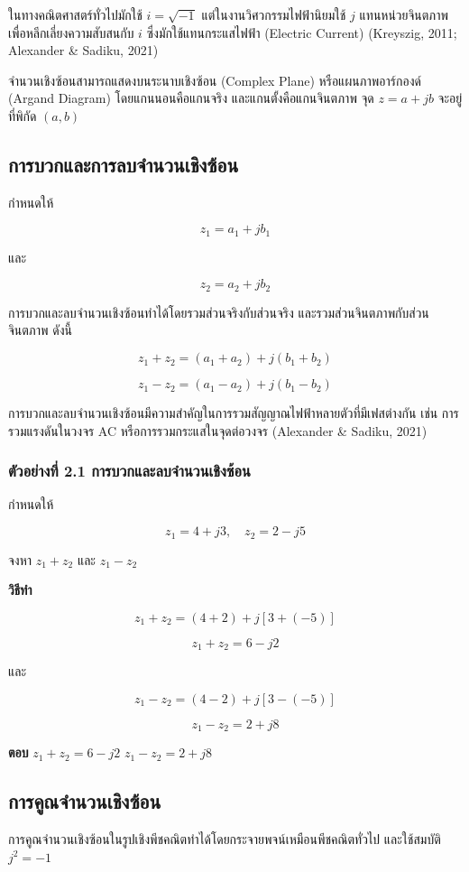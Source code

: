 ในทางคณิตศาสตร์ทั่วไปมักใช้ $i=\sqrt{-1}$ แต่ในงานวิศวกรรมไฟฟ้านิยมใช้ $j$ แทนหน่วยจินตภาพ เพื่อหลีกเลี่ยงความสับสนกับ $i$ ซึ่งมักใช้แทนกระแสไฟฟ้า (Electric Current) (Kreyszig, 2011; Alexander \& Sadiku, 2021)

จำนวนเชิงซ้อนสามารถแสดงบนระนาบเชิงซ้อน (Complex Plane) หรือแผนภาพอาร์กองด์ (Argand Diagram) โดยแกนนอนคือแกนจริง และแกนตั้งคือแกนจินตภาพ จุด $z=a+jb$ จะอยู่ที่พิกัด $(a,b)$

\subsection{การบวกและการลบจำนวนเชิงซ้อน}

กำหนดให้

\[
z_1=a_1+jb_1
\]

และ

\[
z_2=a_2+jb_2
\]

การบวกและลบจำนวนเชิงซ้อนทำได้โดยรวมส่วนจริงกับส่วนจริง และรวมส่วนจินตภาพกับส่วนจินตภาพ ดังนี้

\[
z_1+z_2=(a_1+a_2)+j(b_1+b_2)
\]

\[
z_1-z_2=(a_1-a_2)+j(b_1-b_2)
\]

การบวกและลบจำนวนเชิงซ้อนมีความสำคัญในการรวมสัญญาณไฟฟ้าหลายตัวที่มีเฟสต่างกัน เช่น การรวมแรงดันในวงจร AC หรือการรวมกระแสในจุดต่อวงจร (Alexander \& Sadiku, 2021)

\subsubsection*{ตัวอย่างที่ 2.1 การบวกและลบจำนวนเชิงซ้อน}

กำหนดให้

\[
z_1=4+j3,\quad z_2=2-j5
\]

จงหา $z_1+z_2$ และ $z_1-z_2$

\textbf{วิธีทำ}

\[
z_1+z_2=(4+2)+j[3+(-5)]
\]

\[
z_1+z_2=6-j2
\]

และ

\[
z_1-z_2=(4-2)+j[3-(-5)]
\]

\[
z_1-z_2=2+j8
\]

\textbf{ตอบ}  
$z_1+z_2=6-j2$  
$z_1-z_2=2+j8$

\subsection{การคูณจำนวนเชิงซ้อน}

การคูณจำนวนเชิงซ้อนในรูปเชิงพีชคณิตทำได้โดยกระจายพจน์เหมือนพีชคณิตทั่วไป และใช้สมบัติ $j^2=-1$

